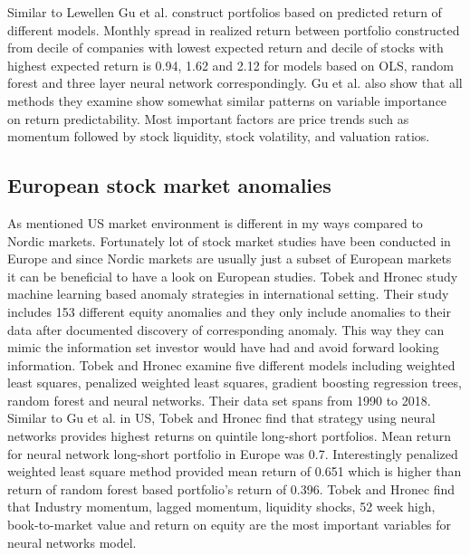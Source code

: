\documentclass{article}
\begin{document}

Similar to Lewellen \citeyear{lewellen2015} Gu et al. construct portfolios based on predicted return of different models. Monthly spread in realized return between portfolio constructed from decile of companies with lowest expected return and decile of stocks with highest expected return \footnotemark is 0.94, 1.62 and 2.12 for models based on OLS, random forest and three layer neural network correspondingly. Gu et al. also show that all methods they examine show somewhat similar patterns on variable importance on return predictability. Most important factors are price trends such as momentum followed by stock liquidity, stock volatility, and valuation ratios.


\subsection{European stock market anomalies}\label{EuropeanStockMarketAnomalies}
As mentioned US market environment is different in my ways compared to Nordic markets. Fortunately lot of stock market studies have been conducted in Europe and since Nordic markets are usually just a subset of European markets it can be beneficial to have a look on European studies. Tobek and Hronec \citeyear{TOBEK2021100588} study machine learning based anomaly strategies in international setting. Their study includes 153 different equity anomalies and they only include anomalies to their data after documented discovery of corresponding anomaly. This way they can mimic the information set investor would have had and avoid forward looking information. Tobek and Hronec examine five different models including weighted least squares, penalized weighted least squares, gradient boosting regression trees, random forest and neural networks. Their data set spans from 1990 to 2018. Similar to Gu et al. \citeyear{guetal} in US, Tobek and Hronec find that strategy using neural networks provides highest returns on quintile long-short portfolios. Mean return for neural network long-short portfolio in Europe was 0.7. Interestingly penalized weighted least square method provided mean return of 0.651 which is higher than return of random forest based portfolio's return of 0.396. Tobek and Hronec find that Industry momentum, lagged momentum, liquidity shocks, 52 week high, book-to-market value and return on equity are the most important variables for neural networks model.\footnotemark
\end{document}
